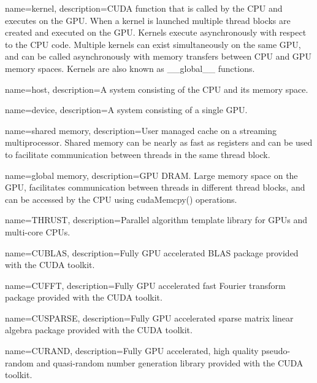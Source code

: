 {
  name=kernel,
  description={CUDA function that is called by the CPU and executes on the GPU. When a kernel is launched multiple thread blocks are created and executed on the GPU. Kernels execute asynchronously with respect to the CPU code. Multiple kernels can exist simultaneously on the same GPU, and can be called asynchronously with memory transfers between CPU and GPU memory spaces. Kernels are also known as \_\_global\_\_ functions.}
}

{
  name=host,
  description={A system consisting of the CPU and its memory space.}
}

{
  name=device,
  description={A system consisting of a single GPU.}
}

{
  name=shared memory,
  description={User managed cache on a streaming multiprocessor. Shared memory can be nearly as fast as registers and can be used to facilitate communication between threads in the same thread block.}
}

{
  name=global memory,
  description={GPU DRAM. Large memory space on the GPU, facilitates communication between threads in different thread blocks, and can be accessed by the CPU using cudaMemcpy() operations.}
}






{
  name=THRUST,
  description={Parallel algorithm template library for GPUs and multi-core CPUs.\cite{NVIDIACorporation2011a} }
}


{
  name=CUBLAS,
  description={Fully GPU accelerated BLAS package provided with the CUDA toolkit.\cite{NVIDIACorporation2012} }
}

{
  name=CUFFT,
  description={Fully GPU accelerated fast Fourier transform package provided with the CUDA toolkit.\cite{NVIDIACorporation2012a}}
}

{
  name=CUSPARSE,
  description={Fully GPU accelerated sparse matrix linear algebra package provided with the CUDA toolkit.\cite{NVIDIACorporation2012c}}
}

{
  name=CURAND,
  description={Fully GPU accelerated, high quality pseudo-random and quasi-random number generation library provided with the CUDA toolkit.\cite{NVIDIACorporation2012b}}
}




























